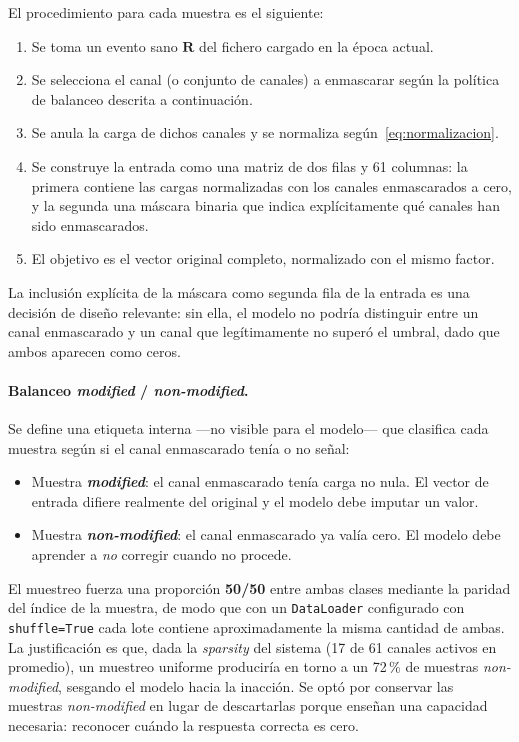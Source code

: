 El procedimiento para cada muestra es el siguiente:

\begin{enumerate}
    \item Se toma un evento sano $\mathbf{R}$ del fichero cargado en la época actual.
    \item Se selecciona el canal (o conjunto de canales) a enmascarar según la política de balanceo
    descrita a continuación.
    \item Se anula la carga de dichos canales y se normaliza según~\eqref{eq:normalizacion}.
    \item Se construye la entrada como una matriz de dos filas y 61 columnas: la primera contiene
    las cargas normalizadas con los canales enmascarados a cero, y la segunda una máscara binaria
    que indica explícitamente qué canales han sido enmascarados.
    \item El objetivo es el vector original completo, normalizado con el mismo factor.
\end{enumerate}

La inclusión explícita de la máscara como segunda fila de la entrada es una decisión de diseño
relevante: sin ella, el modelo no podría distinguir entre un canal enmascarado y un canal que
legítimamente no superó el umbral, dado que ambos aparecen como ceros.

\paragraph{Balanceo \emph{modified} / \emph{non-modified}.} Se define una etiqueta interna ---no
visible para el modelo--- que clasifica cada muestra según si el canal enmascarado tenía o no señal:

\begin{itemize}
    \item Muestra \textbf{\emph{modified}}: el canal enmascarado tenía carga no nula. El vector de
    entrada difiere realmente del original y el modelo debe imputar un valor.
    \item Muestra \textbf{\emph{non-modified}}: el canal enmascarado ya valía cero. El modelo debe
    aprender a \emph{no} corregir cuando no procede.
\end{itemize}

El muestreo fuerza una proporción \textbf{50/50} entre ambas clases mediante la paridad del índice
de la muestra, de modo que con un \texttt{DataLoader} configurado con \texttt{shuffle=True} cada
lote contiene aproximadamente la misma cantidad de ambas. La justificación es que, dada la
\emph{sparsity} del sistema (17 de 61 canales activos en promedio), un muestreo uniforme produciría
en torno a un 72\,\% de muestras \emph{non-modified}, sesgando el modelo hacia la inacción. Se optó
por conservar las muestras \emph{non-modified} en lugar de descartarlas porque enseñan una capacidad
necesaria: reconocer cuándo la respuesta correcta es cero.

